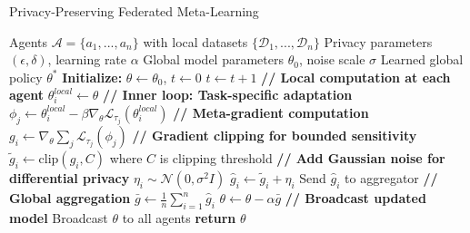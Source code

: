 \begin{algorithm}[htbp]
\caption{Privacy-Preserving Federated Meta-Learning}
\label{alg:federated_meta_learning}
\begin{algorithmic}[1]
\REQUIRE Agents $\mathcal{A} = \{a_1, ..., a_n\}$ with local datasets $\{\mathcal{D}_1, ..., \mathcal{D}_n\}$
\REQUIRE Privacy parameters $(\epsilon, \delta)$, learning rate $\alpha$
\REQUIRE Global model parameters $\theta_0$, noise scale $\sigma$
\ENSURE Learned global policy $\theta^*$
\STATE \textbf{Initialize:} $\theta \gets \theta_0$, $t \gets 0$
    \STATE $t \gets t + 1$
    \STATE \textbf{// Local computation at each agent}
        \STATE $\theta_i^{local} \gets \theta$ 
        \STATE \textbf{// Inner loop: Task-specific adaptation}
            \STATE $\phi_j \gets \theta_i^{local} - \beta \nabla_\theta \mathcal{L}_{\tau_j}(\theta_i^{local})$
        \ENDFOR
        \STATE \textbf{// Meta-gradient computation}
        \STATE $g_i \gets \nabla_\theta \sum_j \mathcal{L}_{\tau_j}(\phi_j)$
        \STATE \textbf{// Gradient clipping for bounded sensitivity}
        \STATE $\tilde{g}_i \gets \text{clip}(g_i, C)$ where $C$ is clipping threshold
        \STATE \textbf{// Add Gaussian noise for differential privacy}
        \STATE $\eta_i \sim \mathcal{N}(0, \sigma^2 I)$
        \STATE $\hat{g}_i \gets \tilde{g}_i + \eta_i$
        \STATE Send $\hat{g}_i$ to aggregator
    \ENDFOR
    \STATE \textbf{// Global aggregation}
    \STATE $\bar{g} \gets \frac{1}{n} \sum_{i=1}^n \hat{g}_i$
    \STATE $\theta \gets \theta - \alpha \bar{g}$
    \STATE \textbf{// Broadcast updated model}
    \STATE Broadcast $\theta$ to all agents
\ENDWHILE
\STATE \textbf{return} $\theta$
\end{algorithmic}
\end{algorithm}

